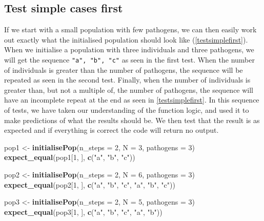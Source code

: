 \documentclass[
]{article}
\newenvironment{Shaded}{\begin{snugshade}}{\end{snugshade}}
\newcommand{\DataTypeTok}[1]{\textcolor[rgb]{0.13,0.29,0.53}{#1}}
\newcommand{\DecValTok}[1]{\textcolor[rgb]{0.00,0.00,0.81}{#1}}
\newcommand{\KeywordTok}[1]{\textcolor[rgb]{0.13,0.29,0.53}{\textbf{#1}}}
\newcommand{\NormalTok}[1]{#1}
\newcommand{\StringTok}[1]{\textcolor[rgb]{0.31,0.60,0.02}{#1}}
\begin{document}
\hypertarget{easycases}{%
\subsection*{Test simple cases first}\label{easycases}}

If we start with a small population with few pathogens, we can then easily work out exactly what the initialised population should look like (\ref{testsimplefirst}).
When we initialise a population with three individuals and three pathogens, we will get the sequence \texttt{"a", "b", "c"} as seen in the first test.
When the number of individuals is greater than the number of pathogens, the sequence will be repeated as seen in the second test.
Finally, when the number of individuals is greater than, but not a multiple of, the number of pathogens, the sequence will have an incomplete repeat at the end as seen in \ref{testsimplefirst}.
In this sequence of tests, we have taken our understanding of the function logic, and used it to make predictions of what the results should be.
We then test that the result is as expected and if everything is correct the code will return no output.
\newline
{}\label{testsimplefirst}

\begin{Shaded}
\begin{Highlighting}[]
\NormalTok{pop1 <-}\StringTok{ }\KeywordTok{initialisePop}\NormalTok{(}\DataTypeTok{n_steps =} \DecValTok{2}\NormalTok{, }\DataTypeTok{N =} \DecValTok{3}\NormalTok{, }\DataTypeTok{pathogens =} \DecValTok{3}\NormalTok{) }
\KeywordTok{expect_equal}\NormalTok{(pop1[}\DecValTok{1}\NormalTok{, ], }\KeywordTok{c}\NormalTok{(}\StringTok{"a"}\NormalTok{, }\StringTok{"b"}\NormalTok{, }\StringTok{"c"}\NormalTok{))}

\NormalTok{pop2 <-}\StringTok{ }\KeywordTok{initialisePop}\NormalTok{(}\DataTypeTok{n_steps =} \DecValTok{2}\NormalTok{, }\DataTypeTok{N =} \DecValTok{6}\NormalTok{, }\DataTypeTok{pathogens =} \DecValTok{3}\NormalTok{) }
\KeywordTok{expect_equal}\NormalTok{(pop2[}\DecValTok{1}\NormalTok{, ], }\KeywordTok{c}\NormalTok{(}\StringTok{"a"}\NormalTok{, }\StringTok{"b"}\NormalTok{, }\StringTok{"c"}\NormalTok{, }\StringTok{"a"}\NormalTok{, }\StringTok{"b"}\NormalTok{, }\StringTok{"c"}\NormalTok{))}

\NormalTok{pop3 <-}\StringTok{ }\KeywordTok{initialisePop}\NormalTok{(}\DataTypeTok{n_steps =} \DecValTok{2}\NormalTok{, }\DataTypeTok{N =} \DecValTok{5}\NormalTok{, }\DataTypeTok{pathogens =} \DecValTok{3}\NormalTok{) }
\KeywordTok{expect_equal}\NormalTok{(pop3[}\DecValTok{1}\NormalTok{, ], }\KeywordTok{c}\NormalTok{(}\StringTok{"a"}\NormalTok{, }\StringTok{"b"}\NormalTok{, }\StringTok{"c"}\NormalTok{, }\StringTok{"a"}\NormalTok{, }\StringTok{"b"}\NormalTok{))}
\end{Highlighting}
\end{Shaded}
\end{document}
